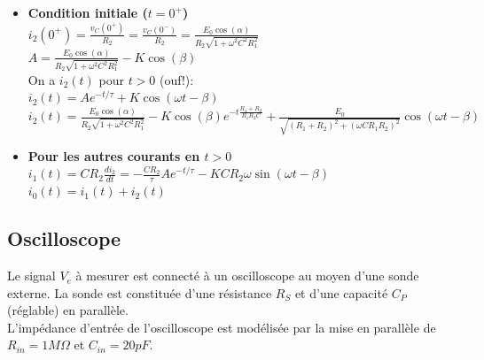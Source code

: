{\begin{itemize}
Pour chercher la solution particulière en $t>0$, $i_{2_p}(t)$, on va utiliser la méthode des phaseurs:\\
$\frac{1}{j\omega C}\underline{I}_1=R_2\underline{I}_2$\\
$\underline{E}_0=R_1(\underline{I}_1+\underline{I}_2)+R_2\underline{I}_2$\\

$\Rightarrow \underline{I}_2=\frac{E_0}{R_1+R_2+j\omega CR_1R_2}$\\
$\underline{I}_1=\frac{j\omega CR_2E_0}{R_1+R_2+j \omega CR_1R_2}$\\

La solution particulière est donc:\\
$$i_{2_p}(t)=K \cos(\omega t-\beta)$$
où $K=\frac{E_0}{\sqrt{(R_1+R_2)^2+(\omega CR_1R_2)^2}}$, $tan(\beta)=\omega \tau$ et $\tau=\frac{R_1R_2C}{R_1+R_2}$\\

La solution générale pour $t>0$ est alors:\\
$i_2(t)=Ae^{-t/\tau}+K \cos(\omega t-\beta)$\\
et il faut identifier $A$ à partir de la condition initiale.\\

\item \textbf{Condition initiale ($t=0^+$)}\\
$i_2(0^+)=\frac{v_C(0^+)}{R_2}=\frac{v_C(0^-)}{R_2}=\frac{E_0 \cos(\alpha)}{R_2\sqrt{1+\omega^2 C^2 R_1^2}}$\\
$A=\frac{E_0 \cos(\alpha)}{R_2\sqrt{1+\omega^2 C^2 R_1^2}}-K\cos(\beta)$\\

On a $i_2(t)$ pour $t>0$ (ouf!):\\
$i_2(t)=Ae^{-t/\tau}+K \cos(\omega t-\beta)$\\
$i_2(t)=\frac{E_0 \cos(\alpha)}{R_2\sqrt{1+\omega^2 C^2 R_1^2}}-K\cos(\beta)e^{-t\frac{R_1+R_2}{R_1R_2C}}+\frac{E_0}{\sqrt{(R_1+R_2)^2+(\omega CR_1R_2)^2}}\cos(\omega t-\beta)$

\item \textbf{Pour les autres courants en $t>0$}\\
$i_1(t)=CR_2\frac{di_2}{dt}=-\frac{CR_2}{\tau}Ae^{-t/\tau}-KCR_2\omega \sin(\omega t-\beta)$\\
$i_0(t)=i_1(t)+i_2(t)$
\end{itemize}
}
{%
}


\subsection{Oscilloscope}
Le signal $V_e$ à mesurer est connecté à un oscilloscope au moyen d'une sonde externe. La sonde est constituée d'une résistance $R_S$ et d'une capacité $C_P$ (réglable) en parallèle.\\
L'impédance d'entrée de l'oscilloscope est modélisée par la mise en parallèle de $R_{in}=1M\Omega$ et $C_{in}=20pF$.\\
 
